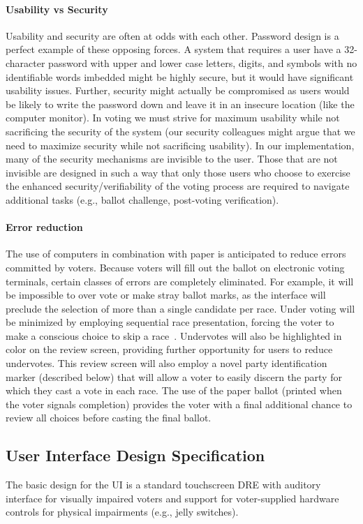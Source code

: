 \documentclass[letterpaper, 10pt, twocolumn]{article}
\begin{document}
\paragraph{Usability vs Security}
Usability and security are often at odds with each other. Password design is a perfect example of these opposing forces. A system that requires a user have a
32-character password with upper and lower case letters, digits, and symbols with no identifiable words imbedded might be highly secure, but it would have significant usability issues. Further, security might actually be compromised as users would be likely to write the password down and leave it in an insecure location (like the computer monitor). In voting we must strive for maximum usability while not sacrificing the security of the system (our security colleagues might argue that we need to maximize security while not sacrificing usability). In our implementation, many of the security mechanisms are invisible to the user. Those that are not invisible are designed in such a way that only those users who choose to exercise the enhanced security/verifiability of the voting process are required to navigate additional tasks (e.g., ballot challenge, post-voting verification). 
\paragraph{Error reduction}
The use of computers in combination with paper is anticipated to reduce errors committed by voters. Because voters will fill out the ballot on electronic voting terminals, certain classes of errors are completely eliminated. For example, it will be impossible to over vote or make stray ballot marks, as the interface will preclude the selection of more than a single candidate per race. Under voting will be minimized by employing sequential race presentation, forcing the voter to make a conscious choice to skip a race~\cite{greene-thesis}. Undervotes will also be highlighted in color on the review screen, providing further opportunity for users to reduce undervotes. This review screen will also employ a novel party identification marker (described below) that will allow a voter to easily discern the party for which they cast a vote in each race. The use of the paper ballot (printed when the voter signals completion) provides the voter with a final additional chance to review all choices before casting the final ballot. 

\subsection{User Interface Design Specification}
The basic design for the UI is a standard touchscreen DRE with auditory interface for visually impaired voters and support for voter-supplied hardware controls for physical impairments (e.g., jelly switches).
\end{document}
